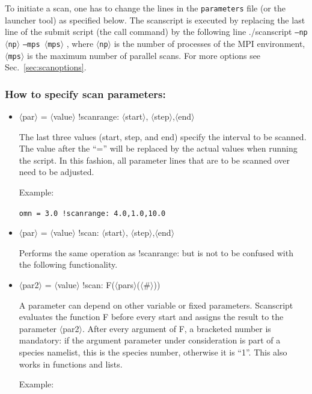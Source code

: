 \documentclass[12pt]{article}
\begin{document}
To initiate a \gene scan, one has to change the lines in the \texttt{parameters} file (or
the launcher tool) as specified below. The scanscript is executed by
replacing the last line of the submit script (the \gene call command)
by the following line 
./scanscript \texttt{--np $\langle$np$\rangle$} \texttt{--mps $\langle$mps$\rangle$} ,
where \texttt{$\langle$np$\rangle$} is the number of processes of the
MPI environment, \texttt{$\langle$mps$\rangle$} is the maximum number of
parallel scans. For more options see Sec.~\ref{sec:scanoptions}. 

\subsubsection{How to specify scan parameters:} \label{sec:scandef}

\begin{itemize}
\item $\langle$par$\rangle$ = $\langle$value$\rangle$ !scanrange: $\langle$start$\rangle$,
$\langle$step$\rangle $,$\langle$end$\rangle$

The last three values (start, step, and end) specify the interval to be scanned. The value after
the ``='' will be replaced by the actual values when running the script. In this fashion,
all parameter lines that are to be scanned over need to be adjusted.

Example:

\texttt{omn = 3.0 !scanrange: 4.0,1.0,10.0}

\item $\langle$par$\rangle$ = $\langle$value$\rangle$ !scan: $\langle$start$\rangle$,
$\langle$step$\rangle $,$\langle$end$\rangle$

Performs the same operation as !scanrange: but is not to be confused
with the following functionality.

\item $\langle$par2$\rangle$ = $\langle$value$\rangle$ !scan:
F($\langle$pars$\rangle$($\langle$\#$\rangle$))

A parameter can depend on other variable or fixed parameters.
Scanscript evaluates the function F before every \gene start and assigns
the result to the parameter $\langle$par2$\rangle$. 
After every argument of F, a bracketed number is mandatory: if the
argument parameter under consideration is part of a species namelist,
this is the
species number, otherwise it is ``1''.
This also works in functions and lists.

Example:


\end{itemize}
\end{document}
